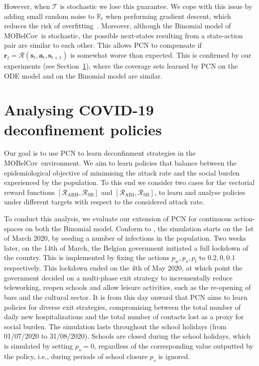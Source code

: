 \documentclass{article}
\renewcommand{\cite}[1]{\citep{#1}}
\newcommand{\mdptransition}{\mathcal{T}}
\newcommand{\mdprewardfn}{\mathcal{R}}
\newcommand{\momdprewardfn}{\bm{\mathcal{R}}}
\newcommand{\mdpstate}{\mathbf{s}}
\newcommand{\momdpreward}{\mathbf{r}}
\newcommand{\mdpaction}{\mathbf{a}}
\newcommand{\momdpname}{MOBelCov}
\begin{document}
However, when $\mdptransition$ is stochastic we lose this guarantee. We cope with this issue by adding small random noise to $\mathbb{R}_t$ when performing gradient descent, which reduces the risk of overfitting~\cite{zur2009noise}. Moreover, although the Binomial model of \momdpname\ is stochastic, the possible next-states resulting from a state-action pair are similar to each other. This allows PCN to compensate if $\momdpreward_t = \momdprewardfn(\mdpstate_t, \mdpaction_t, \mdpstate_{t+1})$ is somewhat worse than expected. This is confirmed by our experiments (see Section~\ref{sec:experiments}), where the coverage sets learned by PCN on the ODE model and on the Binomial model are similar.

\section{Analysing COVID-19 deconfinement policies}
\label{sec:experiments}
Our goal is to use PCN to learn deconfinment strategies in the \momdpname\ environment. We aim to learn policies that balance between the epidemiological objective of minimising the attack rate and the social burden experienced by the population. To this end we consider two cases for the vectorial reward functions $[\mdprewardfn_\text{ARH}, \mdprewardfn_\text{SB}]$ and $[\mdprewardfn_\text{ARI}, \mdprewardfn_\text{SB}]$, to learn and analyse policies under different targets with respect to the considered attack rate.

To conduct this analysis, we evaluate our extension of PCN for continuous action-spaces on both the Binomial model. Conform to \citet{abrams2021modelling}, the simulation starts on the 1st of March 2020, by seeding a number of infections in the population. Two weeks later, on the 14th of March, the Belgian government initiated a full lockdown of the country. This is implemented by fixing the actions $p_w, p_s, p_l$ to $0.2, 0, 0.1$ respectively. This lockdown ended on the 4th of May 2020, at which point the government decided on a multi-phase exit strategy to incrementally reduce teleworking, reopen schools and allow leisure activities, such as the re-opening of bars and the cultural sector. It is from this day onward that PCN aims to learn policies for diverse exit strategies, compromising between the total number of daily new hospitalizations and the total number of contacts lost as a proxy for social burden. The simulation lasts throughout the school holidays (from 01/07/2020 to 31/08/2020). Schools are closed during the school holidays, which is simulated by setting $p_s = 0$, regardless of the corresponding value outputted by the policy, i.e., during periods of school closure $p_s$ is ignored.
\end{document}
